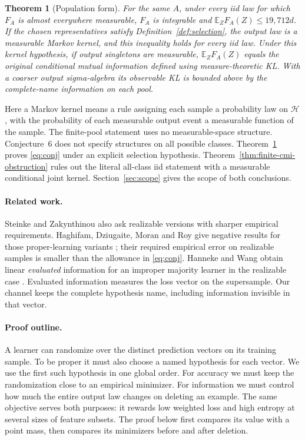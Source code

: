 \documentclass[11pt]{article}
\newtheorem{theorem}{Theorem}[section]
\theoremstyle{definition}\newtheorem{definition}[theorem]{Definition}
\newcommand{\E}{\mathbb E}
\newcommand{\HH}{\mathcal H}
\begin{document}
\begin{theorem}[Population form]\label{thm:iid}
For the same $A$, under every iid law for which $F_A$ is almost everywhere
measurable, $F_A$ is integrable and $\E_Z F_A(Z)\le19{,}712d$.
If the chosen representatives satisfy Definition~\ref{def:selection}, the
output law is a measurable Markov kernel, and this inequality holds for
every iid law. Under this kernel hypothesis, if output singletons are measurable, $\E_Z F_A(Z)$ equals
the original conditional mutual information defined using measure-theoretic
KL. With a coarser output sigma-algebra its observable KL is bounded above by
the complete-name information on each pool.
\end{theorem}

Here a Markov kernel means a rule assigning each sample a probability law on
$\HH$, with the probability of each measurable output event a measurable
function of the sample. The finite-pool statement uses no measurable-space
structure. Conjecture~6 does not specify structures on all possible classes.
Theorem~\ref{thm:iid} proves \eqref{eq:conj} under an explicit selection
hypothesis. Theorem~\ref{thm:finite-cmi-obstruction} rules out the literal
all-class iid statement with a measurable conditional joint kernel.
Section~\ref{sec:scope} gives the scope of both conclusions.

\paragraph{Related work.}
Steinke and Zakynthinou also ask realizable versions with sharper empirical
requirements. Haghifam, Dziugaite, Moran and Roy give negative results for
those proper-learning variants \cite{haghifam}; their required empirical
error on realizable samples is smaller than the allowance in
\eqref{eq:conj}. Hanneke and Wang obtain linear \emph{evaluated} information
for an improper majority learner in the realizable case \cite{hanneke}.
Evaluated information measures the loss vector on the supersample. Our
channel keeps the complete hypothesis name, including information invisible
in that vector.

\paragraph{Proof outline.}
A learner can randomize over the distinct prediction vectors on its training
sample. To be proper it must also choose a named hypothesis for each vector.
We use the first such hypothesis in one global order. For accuracy we must
keep the randomization close to an empirical minimizer. For information we
must control how much the entire output law changes on deleting an example.
The same objective serves both purposes: it rewards low weighted loss and
high entropy at several sizes of feature subsets. The proof below first
compares its value with a point mass, then compares its minimizers before
and after deletion.
\end{document}
